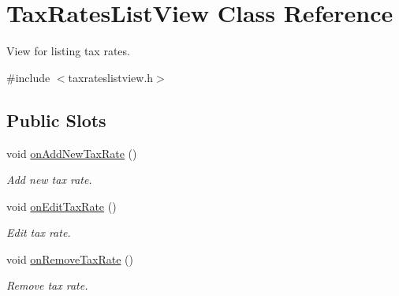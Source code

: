 \hypertarget{class_tax_rates_list_view}{\section{\-Tax\-Rates\-List\-View \-Class \-Reference}
\label{class_tax_rates_list_view}
}


\-View for listing tax rates.  




{\ttfamily \#include $<$taxrateslistview.\-h$>$}

\subsection*{\-Public \-Slots}
\begin{DoxyCompactItemize}
\item 
void \hyperlink{class_tax_rates_list_view_aea1a58f443ac3ab6904ddd2fd9f5de55}{on\-Add\-New\-Tax\-Rate} ()
\begin{DoxyCompactList}\small\item\em \-Add new tax rate. \end{DoxyCompactList}\item 
void \hyperlink{class_tax_rates_list_view_a7986160269490de1246ec4b52317ffa6}{on\-Edit\-Tax\-Rate} ()
\begin{DoxyCompactList}\small\item\em \-Edit tax rate. \end{DoxyCompactList}\item 
void \hyperlink{class_tax_rates_list_view_a260ce33798b040be8d64b85533bdcb7a}{on\-Remove\-Tax\-Rate} ()
\begin{DoxyCompactList}\small\item\em \-Remove tax rate. \end{DoxyCompactList}\end{DoxyCompactItemize}
